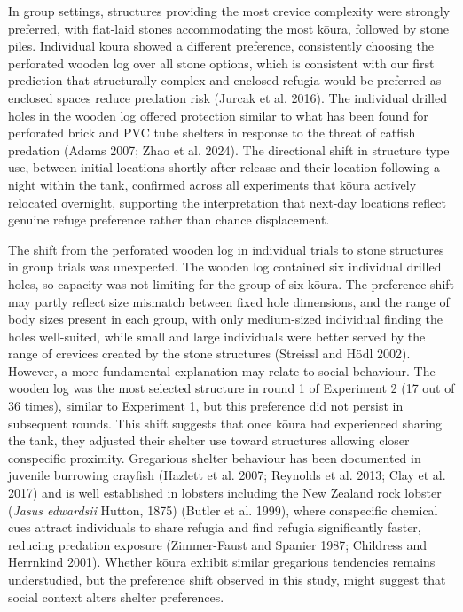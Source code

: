\documentclass[
  12pt,
  a4paper,
  oneside]{scrbook}
\begin{document}
In group settings, structures providing the most crevice complexity were
strongly preferred, with flat-laid stones accommodating the most kōura,
followed by stone piles. Individual kōura showed a different preference,
consistently choosing the perforated wooden log over all stone options,
which is consistent with our first prediction that structurally complex
and enclosed refugia would be preferred as enclosed spaces reduce
predation risk (Jurcak et al. 2016). The individual drilled holes in the
wooden log offered protection similar to what has been found for
perforated brick and PVC tube shelters in response to the threat of
catfish predation (Adams 2007; Zhao et al. 2024). The directional shift
in structure type use, between initial locations shortly after release
and their location following a night within the tank, confirmed across
all experiments that kōura actively relocated overnight, supporting the
interpretation that next-day locations reflect genuine refuge preference
rather than chance displacement.

The shift from the perforated wooden log in individual trials to stone
structures in group trials was unexpected. The wooden log contained six
individual drilled holes, so capacity was not limiting for the group of
six kōura. The preference shift may partly reflect size mismatch between
fixed hole dimensions, and the range of body sizes present in each
group, with only medium-sized individual finding the holes well-suited,
while small and large individuals were better served by the range of
crevices created by the stone structures (Streissl and Hödl 2002).
However, a more fundamental explanation may relate to social behaviour.
The wooden log was the most selected structure in round 1 of Experiment
2 (17 out of 36 times), similar to Experiment 1, but this preference did
not persist in subsequent rounds. This shift suggests that once kōura
had experienced sharing the tank, they adjusted their shelter use toward
structures allowing closer conspecific proximity. Gregarious shelter
behaviour has been documented in juvenile burrowing crayfish (Hazlett et
al. 2007; Reynolds et al. 2013; Clay et al. 2017) and is well
established in lobsters including the New Zealand rock lobster
(\emph{Jasus edwardsii} Hutton, 1875) (Butler et al. 1999), where
conspecific chemical cues attract individuals to share refugia and find
refugia significantly faster, reducing predation exposure (Zimmer-Faust
and Spanier 1987; Childress and Herrnkind 2001). Whether kōura exhibit
similar gregarious tendencies remains understudied, but the preference
shift observed in this study, might suggest that social context alters
shelter preferences.
\end{document}
